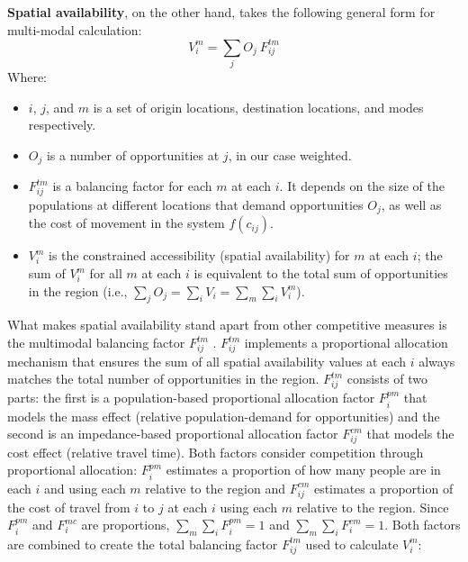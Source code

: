 \documentclass[
  authoryear,
  preprint,
  3p]{elsarticle}
\providecommand{\tightlist}{%
  \setlength{\itemsep}{0pt}\setlength{\parskip}{0pt}}\usepackage{longtable,booktabs,array}
\def\tightlist{}
\begin{document}
\textbf{Spatial availability}, on the other hand, takes the following
general form for multi-modal calculation: \[
V^m_{i} = \sum_{j} O_j\ F^{tm}_{ij}
\] \noindent Where:

\begin{itemize}
\tightlist
\item
  \(i\), \(j\), and \(m\) is a set of origin locations, destination
  locations, and modes respectively.
\item
  \(O_j\) is a number of opportunities at \(j\), in our case weighted.
\item
  \(F^{tm}_{ij}\) is a balancing factor for each \(m\) at each \(i\). It
  depends on the size of the populations at different locations that
  demand opportunities \(O_j\), as well as the cost of movement in the
  system \(f(c_{ij})\).
\item
  \(V^m_{i}\) is the constrained accessibility (spatial availability)
  for \(m\) at each \(i\); the sum of \(V^m_{i}\) for all \(m\) at each
  \(i\) is equivalent to the total sum of opportunities in the region
  (i.e., \(\sum_j O_j = \sum_i V_i = \sum_{m} \sum_{i} V^m_{i}\)).
\end{itemize}

What makes spatial availability stand apart from other competitive
measures is the multimodal balancing factor \(F^{tm}_{ij}\)
\citep[see][]{soukhovMultimodalSpatialAvailability2023, soukhovIntroducingSpatialAvailability2023}.
\(F^{tm}_{ij}\) implements a proportional allocation mechanism that
ensures the sum of all spatial availability values at each \(i\) always
matches the total number of opportunities in the region. \(F^{tm}_{ij}\)
consists of two parts: the first is a population-based proportional
allocation factor \(F_i^{pm}\) that models the mass effect (relative
population-demand for opportunities) and the second is an
impedance-based proportional allocation factor \(F_{ij}^{cm}\) that
models the cost effect (relative travel time). Both factors consider
competition through proportional allocation: \(F^{pm}_{i}\) estimates a
proportion of how many people are in each \(i\) and using each \(m\)
relative to the region and \(F^{cm}_{ij}\) estimates a proportion of the
cost of travel from \(i\) to \(j\) at each \(i\) using each \(m\)
relative to the region. Since \(F^{pm}_{i}\) and \(F^{mc}_{i}\) are
proportions, \(\sum_{m}\sum_{i}F^{pm}_{i} = 1\) and
\(\sum_{m} \sum_{i}F^{cm}_{i}=1\). Both factors are combined to create
the total balancing factor \(F^{tm}_{ij}\) used to calculate \(V^m_i\):
\end{document}

